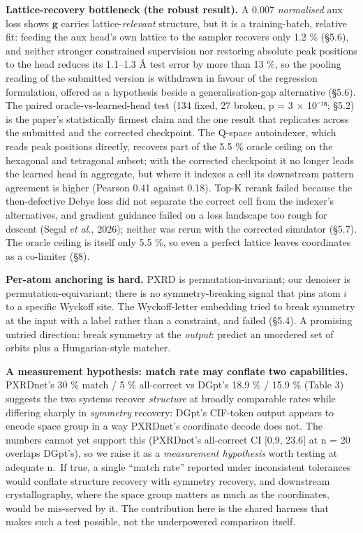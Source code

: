 \documentclass[
  11pt,
]{article}
\begin{document}
\textbf{Lattice-recovery bottleneck (the robust result).} A 0.007
\emph{normalised} aux loss shows \(\mathbf{g}\) carries
lattice-\emph{relevant} structure, but it is a training-batch, relative
fit: feeding the aux head's own lattice to the sampler recovers only 1.2
\% (§5.6), and neither stronger constrained supervision nor restoring
absolute peak positions to the head reduces its 1.1--1.3 Å test error by
more than 13 \%, so the pooling reading of the submitted version is
withdrawn in favour of the regression formulation, offered as a
hypothesis beside a generalisation-gap alternative (§5.6). The paired
oracle-vs-learned-head test (134 fixed, 27 broken, p = 3 × 10⁻¹⁸; §5.2)
is the paper's statistically firmest claim and the one result that
replicates across the submitted and the corrected checkpoint. The
Q-space autoindexer, which reads peak positions directly, recovers part
of the 5.5 \% oracle ceiling on the hexagonal and tetragonal subset;
with the corrected checkpoint it no longer leads the learned head in
aggregate, but where it indexes a cell its downstream pattern agreement
is higher (Pearson 0.41 against 0.18). Top-K rerank failed because the
then-defective Debye loss did not separate the correct cell from the
indexer's alternatives, and gradient guidance failed on a loss landscape
too rough for descent (Segal \emph{et al.}, 2026); neither was rerun
with the corrected simulator (§5.7). The oracle ceiling is itself only
5.5 \%, so even a perfect lattice leaves coordinates as a co-limiter
(§8).

\textbf{Per-atom anchoring is hard.} PXRD is permutation-invariant; our
denoiser is permutation-equivariant; there is no symmetry-breaking
signal that pins atom \(i\) to a specific Wyckoff site. The
Wyckoff-letter embedding tried to break symmetry at the input with a
label rather than a constraint, and failed (§5.4). A promising untried
direction: break symmetry at the \emph{output}: predict an unordered set
of orbits plus a Hungarian-style matcher.

\textbf{A measurement hypothesis: match rate may conflate two
capabilities.} PXRDnet's 30 \% match / 5 \% all-correct vs DGpt's 18.9
\% / 15.9 \% (Table 3) suggests the two systems recover \emph{structure}
at broadly comparable rates while differing sharply in \emph{symmetry}
recovery: DGpt's CIF-token output appears to encode space group in a way
PXRDnet's coordinate decode does not. The numbers cannot yet support
this (PXRDnet's all-correct CI {[}0.9, 23.6{]} at n = 20 overlaps
DGpt's), so we raise it as a \emph{measurement hypothesis} worth testing
at adequate n.~If true, a single ``match rate'' reported under
inconsistent tolerances would conflate structure recovery with symmetry
recovery, and downstream crystallography, where the space group matters
as much as the coordinates, would be mis-served by it. The contribution
here is the shared harness that makes such a test possible, not the
underpowered comparison itself.
\end{document}

